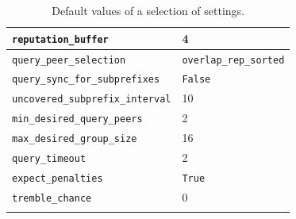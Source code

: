 \begin{longtable}{|l|l|}
\hline
\cellcolor{slightgray}\T \texttt{reputation\_buffer} & 4 \B\\
\hline
\cellcolor{slightgray}\T \texttt{query\_peer\_selection} & \texttt{overlap\_rep\_sorted} \B\\
\hline
\cellcolor{slightgray}\T \texttt{query\_sync\_for\_subprefixes} & \texttt{False} \B\\
\hline
\cellcolor{slightgray}\T \texttt{uncovered\_subprefix\_interval} & 10 \B\\
\hline
\cellcolor{slightgray}\T \texttt{min\_desired\_query\_peers} & 2 \B\\
\hline
\cellcolor{slightgray}\T \texttt{max\_desired\_group\_size} & 16 \B\\
\hline
\cellcolor{slightgray}\T \texttt{query\_timeout} & 2 \B\\
\hline
\cellcolor{slightgray}\T \texttt{expect\_penalties} & \texttt{True} \B\\
\hline
\cellcolor{slightgray}\T \texttt{tremble\_chance} & 0 \B\\
\hline
\caption{Default values of a selection of settings.}
\label{tab:default_settings}
\end{longtable}

